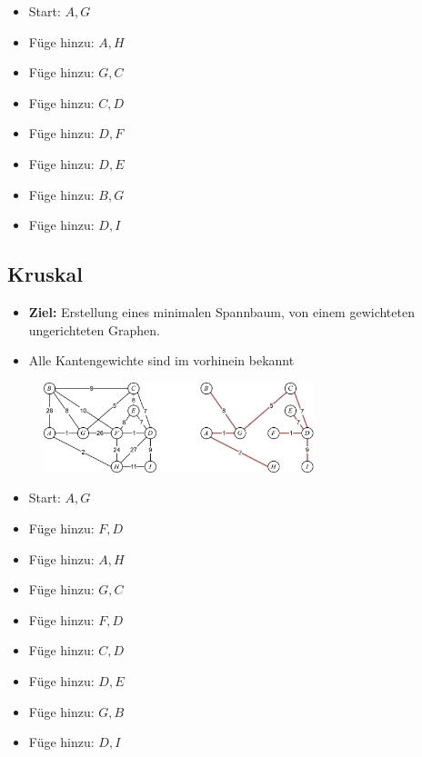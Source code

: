 \begin{itemize}
\item Start: ${A,G}$
\item Füge hinzu: ${A,H}$
\item Füge hinzu: ${G,C}$
\item Füge hinzu: ${C,D}$
\item Füge hinzu: ${D,F}$
\item Füge hinzu: ${D,E}$
\item Füge hinzu: ${B,G}$
\item Füge hinzu: ${D,I}$
\end{itemize}

\newpage

\subsection{Kruskal}

\begin{itemize}
\item \textbf{Ziel:} Erstellung eines minimalen Spannbaum, von einem gewichteten ungerichteten Graphen.
\item Alle Kantengewichte sind im vorhinein bekannt
\end{itemize}

\begin{figure}[h]
\centering
\includegraphics[width=0.7\textwidth]{graphics/prim_kruskal.png}
\end{figure}

\begin{itemize}
\item Start: ${A,G}$
\item Füge hinzu: ${F,D}$
\item Füge hinzu: ${A,H}$
\item Füge hinzu: ${G,C}$
\item Füge hinzu: ${F,D}$
\item Füge hinzu: ${C,D}$
\item Füge hinzu: ${D,E}$
\item Füge hinzu: ${G,B}$
\item Füge hinzu: ${D,I}$
\end{itemize}